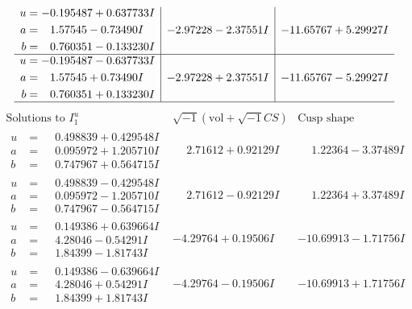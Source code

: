 \documentclass[1p]{elsarticle_modified}
\theoremstyle{definition}
\newcommand{\I}{\sqrt{-1}}
\begin{document}
$$\begin{array}{c|c|c}
\begin{aligned}
u &= -0.195487 + 0.637733 I \\
a &= \phantom{-}1.57545 - 0.73490 I \\
b &= \phantom{-}0.760351 - 0.133230 I\end{aligned}
 & -2.97228 - 2.37551 I & -11.65767 + 5.29927 I \\ \hline\begin{aligned}
u &= -0.195487 - 0.637733 I \\
a &= \phantom{-}1.57545 + 0.73490 I \\
b &= \phantom{-}0.760351 + 0.133230 I\end{aligned}
 & -2.97228 + 2.37551 I & -11.65767 - 5.29927 I\\
 \hline 
 \end{array}$$\newpage$$\begin{array}{c|c|c}  
\text{Solutions to }I^u_{1}& \I (\text{vol} + \sqrt{-1}CS) & \text{Cusp shape}\\
 \hline 
\begin{aligned}
u &= \phantom{-}0.498839 + 0.429548 I \\
a &= \phantom{-}0.095972 + 1.205710 I \\
b &= \phantom{-}0.747967 + 0.564715 I\end{aligned}
 & \phantom{-}2.71612 + 0.92129 I & \phantom{-}1.22364 - 3.37489 I \\ \hline\begin{aligned}
u &= \phantom{-}0.498839 - 0.429548 I \\
a &= \phantom{-}0.095972 - 1.205710 I \\
b &= \phantom{-}0.747967 - 0.564715 I\end{aligned}
 & \phantom{-}2.71612 - 0.92129 I & \phantom{-}1.22364 + 3.37489 I \\ \hline\begin{aligned}
u &= \phantom{-}0.149386 + 0.639664 I \\
a &= \phantom{-}4.28046 - 0.54291 I \\
b &= \phantom{-}1.84399 - 1.81743 I\end{aligned}
 & -4.29764 + 0.19506 I & -10.69913 - 1.71756 I \\ \hline\begin{aligned}
u &= \phantom{-}0.149386 - 0.639664 I \\
a &= \phantom{-}4.28046 + 0.54291 I \\
b &= \phantom{-}1.84399 + 1.81743 I\end{aligned}
 & -4.29764 - 0.19506 I & -10.69913 + 1.71756 I \\ \hline\begin{aligned}

\end{aligned}
\end{array}$$
\end{document}
